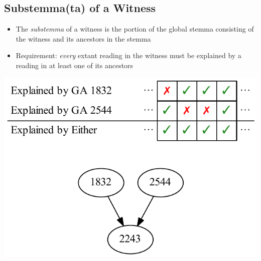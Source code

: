 \documentclass[10pt]{beamer}
\begin{document}
	\subsection{Substemma(ta) of a Witness}
	\begin{frame}
		\begin{itemize}
			\item The \emph{substemma} of a witness is the portion of the global stemma consisting of the witness and its ancestors in the stemma
			\item Requirement: \emph{every} extant reading in the witness must be explained by a reading in at least one of its ancestors
		\end{itemize}
		\begin{center}
			\includegraphics[scale=0.5]{../img/ga-2243-substemma.pdf}
		\end{center}
	\end{frame}
\end{document}

